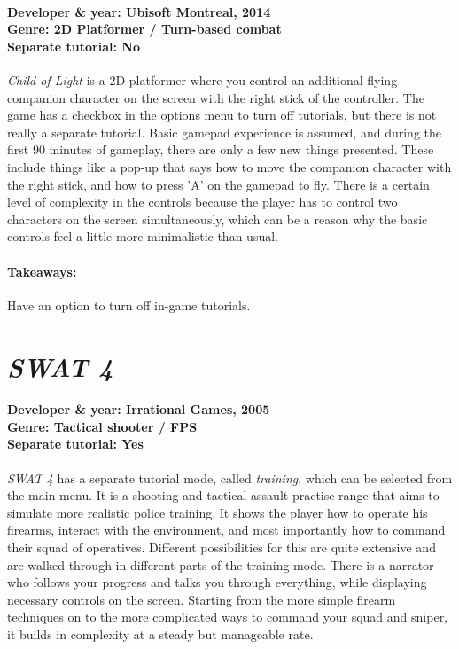 \paragraph{Developer \& year: Ubisoft Montreal, 2014 \\ Genre: 2D Platformer / Turn-based combat \\ Separate tutorial: No \\}
\textit{Child of Light} is a 2D platformer where you control an additional flying companion character on the screen with the right stick of the controller. The game has a checkbox in the options menu to turn off tutorials, but there is not really a separate tutorial. Basic gamepad experience is assumed, and during the first 90 minutes of gameplay, there are only a few new things presented. These include things like a pop-up that says how to move the companion character with the right stick, and how to press 'A' on the gamepad to fly. There is a certain level of complexity in the controls because the player has to control two characters on the screen simultaneously, which can be a reason why the basic controls feel a little more minimalistic than usual.
\paragraph{Takeaways:}
Have an option to turn off in-game tutorials.

\section{\textit{SWAT 4}}
\paragraph{Developer \& year: Irrational Games, 2005 \\ Genre: Tactical shooter / FPS \\ Separate tutorial: Yes \\}
\textit{SWAT 4} has a separate tutorial mode, called \textit{training}, which can be selected from the main menu. It is a shooting and tactical assault practise range that aims to simulate more realistic police training. It shows the player how to operate his firearms, interact with the environment, and most importantly how to command their squad of operatives. Different possibilities for this are quite extensive and are walked through in different parts of the training mode. There is a narrator who follows your progress and talks you through everything, while displaying necessary controls on the screen. Starting from the more simple firearm techniques on to the more complicated ways to command your squad and sniper, it builds in complexity at a steady but manageable rate.
